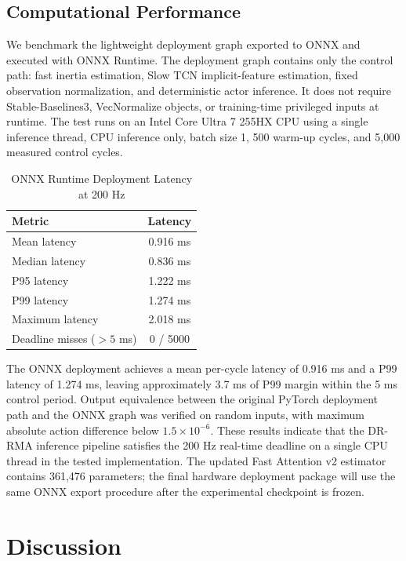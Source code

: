 \documentclass[lettersize,journal]{IEEEtran}
\begin{document}
\subsection{Computational Performance}
\label{sec:computational_performance}

We benchmark the lightweight deployment graph exported to ONNX and executed with ONNX Runtime. The deployment graph contains only the control path: fast inertia estimation, Slow TCN implicit-feature estimation, fixed observation normalization, and deterministic actor inference. It does not require Stable-Baselines3, VecNormalize objects, or training-time privileged inputs at runtime. The test runs on an Intel Core Ultra 7 255HX CPU using a single inference thread, CPU inference only, batch size 1, 500 warm-up cycles, and 5,000 measured control cycles.

\begin{table}[t]
\centering
\caption{ONNX Runtime Deployment Latency at 200 Hz}
\label{tab:deployment_latency}
\footnotesize
\begin{tabular}{@{}lc@{}}
\toprule
Metric & Latency \\
\midrule
Mean latency & 0.916 ms \\
Median latency & 0.836 ms \\
P95 latency & 1.222 ms \\
P99 latency & 1.274 ms \\
Maximum latency & 2.018 ms \\
Deadline misses ($>5$ ms) & 0 / 5000 \\
\bottomrule
\end{tabular}
\end{table}

The ONNX deployment achieves a mean per-cycle latency of 0.916 ms and a P99 latency of 1.274 ms, leaving approximately 3.7 ms of P99 margin within the 5 ms control period. Output equivalence between the original PyTorch deployment path and the ONNX graph was verified on random inputs, with maximum absolute action difference below $1.5\times10^{-6}$. These results indicate that the DR-RMA inference pipeline satisfies the 200 Hz real-time deadline on a single CPU thread in the tested implementation. The updated Fast Attention v2 estimator contains 361,476 parameters; the final hardware deployment package will use the same ONNX export procedure after the experimental checkpoint is frozen.

\section{Discussion}
\end{document}
